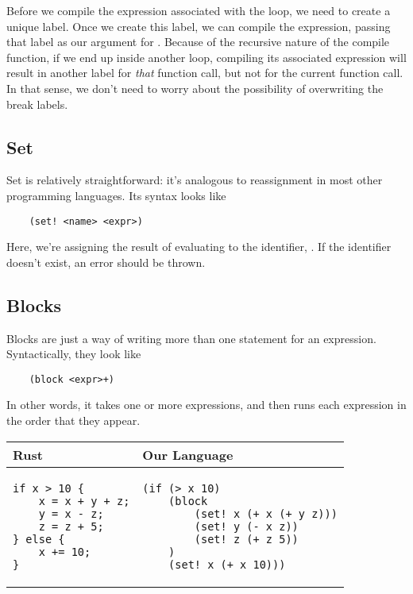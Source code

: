 \bigskip 

Before we compile the expression associated with the loop, we need to create a unique label. Once we create this label, we can compile the expression, passing that label as our argument for . Because of the recursive nature of the compile function, if we end up inside another loop, compiling its associated expression will result in another label for \emph{that} function call, but not for the current function call. In that sense, we don't need to worry about the possibility of overwriting the break labels.

\subsection{Set}
Set is relatively straightforward: it's analogous to reassignment in most other programming languages. Its syntax looks like 
\begin{verbatim}
    (set! <name> <expr>)\end{verbatim}
Here, we're assigning the result of evaluating  to the identifier, . If the identifier doesn't exist, an error should be thrown. 

\subsection{Blocks}
Blocks are just a way of writing more than one statement for an expression. Syntactically, they look like 
\begin{verbatim}
    (block <expr>+)\end{verbatim}
In other words, it takes one or more expressions, and then runs each expression in the order that they appear.

\begin{center}
    \begin{tabular}{p{3in}|p{3in}}
        Rust & Our Language \\ 
        \hline 
        \begin{verbatim}
if x > 10 {
    x = x + y + z;
    y = x - z;
    z = z + 5;
} else {
    x += 10;
}\end{verbatim} 
            & \begin{verbatim}
(if (> x 10) 
    (block 
        (set! x (+ x (+ y z)))
        (set! y (- x z))
        (set! z (+ z 5))
    ) 
    (set! x (+ x 10)))\end{verbatim}
    \end{tabular}
\end{center}

